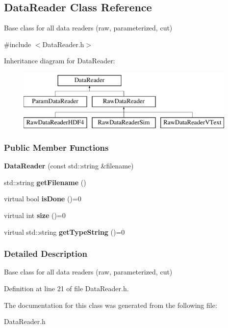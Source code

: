 \hypertarget{classDataReader}{
\subsection{DataReader Class Reference}
\label{classDataReader}
}


Base class for all data readers (raw, parameterized, cut)  




{\ttfamily \#include $<$DataReader.h$>$}

Inheritance diagram for DataReader:\begin{figure}[H]
\begin{center}
\leavevmode
\includegraphics[height=3.000000cm]{classDataReader}
\end{center}
\end{figure}
\subsubsection*{Public Member Functions}
\begin{DoxyCompactItemize}
\item 
\hypertarget{classDataReader_aa905accd5935bffd48aba689f4f45c4c}{
{\bfseries DataReader} (const std::string \&filename)}
\label{classDataReader_aa905accd5935bffd48aba689f4f45c4c}

\item 
\hypertarget{classDataReader_a3390579e206a8b22b43f1d60ac86a423}{
std::string {\bfseries getFilename} ()}
\label{classDataReader_a3390579e206a8b22b43f1d60ac86a423}

\item 
\hypertarget{classDataReader_acc6161e84da4a6ff14eea42933590687}{
virtual bool {\bfseries isDone} ()=0}
\label{classDataReader_acc6161e84da4a6ff14eea42933590687}

\item 
\hypertarget{classDataReader_a5395e794e7e38edfb8d9492fdbed9293}{
virtual int {\bfseries size} ()=0}
\label{classDataReader_a5395e794e7e38edfb8d9492fdbed9293}

\item 
\hypertarget{classDataReader_a227c561f64239b508293e15d2dc78335}{
virtual std::string {\bfseries getTypeString} ()=0}
\label{classDataReader_a227c561f64239b508293e15d2dc78335}

\end{DoxyCompactItemize}


\subsubsection{Detailed Description}
Base class for all data readers (raw, parameterized, cut) 

Definition at line 21 of file DataReader.h.



The documentation for this class was generated from the following file:\begin{DoxyCompactItemize}
\item 
DataReader.h\end{DoxyCompactItemize}
